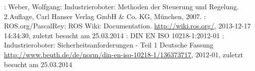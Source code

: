 \begin{thebibliography}{XXXXXX-JJJJa}



\renewcommand{\bibname}{A. ~Literaturverzeichnis}
\setcounter{chapter}{1}



: Weber, Wolfgang: Industrieroboter: Methoden der Steuerung und Regelung. 2.Auflage, Carl Hanser Verlag GmbH \& Co. KG, München, 2007.
: ROS.org/PascalRey: ROS Wiki: Documentation. \url{http://wiki.ros.org/}, 2013-12-17 14:34:30, zuletzt besucht am 25.03.2014
: DIN EN ISO 10218-1:2012-01 : Industrieroboter: Sicherheitsanforderungen - Teil 1 Deutsche Fassung \url{http://www.beuth.de/de/norm/din-en-iso-10218-1/136373717}, 2012-01, zuletzt besucht am 25.03.2014


\end{thebibliography}